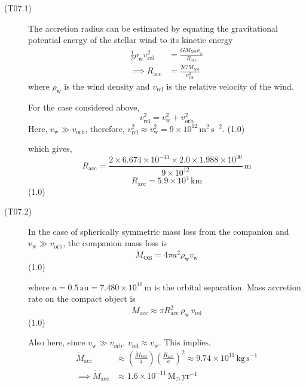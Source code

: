 \begin{description}
\item[(T07.1)] The accretion radius can be estimated by equating the
  gravitational potential energy of the stellar wind to its kinetic energy
  \begin{align*}
    \frac{1}{2}\rho_{\mathrm{w}} v_{\mathrm{rel}}^2
      &= \frac{G M_{\mathrm{NS}} \rho_{\mathrm{w}}}{R_{\mathrm{acc}}}
      \tag*{(0.5)}\\
    \implies R_{\mathrm{acc}} &= \frac{2 G M_{\mathrm{NS}}}{v_{\mathrm{rel}}^2}
      \tag*{(0.5)}
  \end{align*}
  where $\rho_{\mathrm{w}}$ is the wind density and $v_{\mathrm{rel}}$ is the
  relative velocity of the wind.

  For the case considered above,
  \[
    v_{\mathrm{rel}}^2 = v_{\mathrm{w}}^2 + v_{\mathrm{orb}}^2
  \]
  Here, $v_{\mathrm{w}} \gg v_{\mathrm{orb}}$, therefore,
  $v_{\mathrm{rel}}^2 \approx v_{\mathrm{w}}^2
  = 9 \times 10^{12}\,\mathrm{m^2\,s^{-2}}$. \hfill(1.0)

  which gives,
  \[
    R_{\mathrm{acc}} = \frac{2 \times 6.674 \times 10^{-11} \times 2.0 \times
      1.988 \times 10^{30}}{9 \times 10^{12}}\,\mathrm{m}
  \]
  \[
    R_{\mathrm{acc}} = 5.9 \times 10^{4}\,\mathrm{km}
  \]
  \hfill(1.0)

\item[(T07.2)] In the case of spherically symmetric mass loss from the
  companion and $v_{\mathrm{w}} \gg v_{\mathrm{orb}}$, the companion mass loss
  is
  \[
    \dot{M}_{\mathrm{OB}} = 4\pi a^2 \rho_{\mathrm{w}} v_{\mathrm{w}}
  \]
  \hfill(1.0)

  where $a = 0.5\,\mathrm{au} = 7.480 \times 10^{10}$\,m is the orbital
  separation. Mass accretion rate on the compact object is
  \[
    \dot{M}_{\mathrm{acc}} \approx \pi R_{\mathrm{acc}}^2\,\rho_{\mathrm{w}}\,
      v_{\mathrm{rel}}
  \]
  \hfill(1.0)

  Also here, since $v_{\mathrm{w}} \gg v_{\mathrm{orb}}$,
  $v_{\mathrm{rel}} \approx v_{\mathrm{w}}$. This implies,
  \begin{align*}
    \dot{M}_{\mathrm{acc}}
      &\approx \left(\frac{\dot{M}_{\mathrm{OB}}}{4}\right)
        \left(\frac{R_{\mathrm{acc}}}{a}\right)^2
        \approx 9.74 \times 10^{11}\,\mathrm{kg\,s^{-1}}\\
    \implies \dot{M}_{\mathrm{acc}}
      &\approx 1.6 \times 10^{-11}\,\mathrm{M_\odot\,yr^{-1}}
      \tag*{(1.0)}
  \end{align*}


\end{description}
